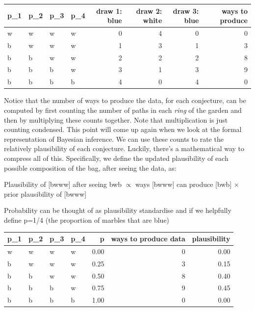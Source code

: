 \documentclass{article}
\begin{document}
\begin{table}
\centering
\begin{tabular}{l|l|l|l|r|r|r|r}
\hline
p\_1 & p\_2 & p\_3 & p\_4 & draw 1: blue & draw 2: white & draw 3: blue & ways to produce\\
\hline
w & w & w & w & 0 & 4 & 0 & 0\\
\hline
b & w & w & w & 1 & 3 & 1 & 3\\
\hline
b & b & w & w & 2 & 2 & 2 & 8\\
\hline
b & b & b & w & 3 & 1 & 3 & 9\\
\hline
b & b & b & b & 4 & 0 & 4 & 0\\
\hline
\end{tabular}
\end{table}

Notice that the number of ways to produce the data, for each conjecture,
can be computed by first counting the number of paths in each
\emph{ring} of the garden and then by multiplying these counts together.
Note that multiplication is just counting condensed. This point will
come up again when we look at the formal representation of Bayesian
inference. We can use these counts to rate the relatively plausibility
of each conjecture. Luckily, there's a mathematical way to compress all
of this. Specifically, we define the updated plausibility of each
possible composition of the bag, after seeing the data, as:

Plausibility of {[}bwww{]} after seeing bwb \(\propto\) ways {[}bwww{]}
can produce {[}bwb{]} \(\times\) prior plausibility of {[}bwww{]}

Probability can be thought of as plausibility standardise and if we
helpfully define p=1/4 (the proportion of marbles that are blue)

\begin{table}
\centering
\begin{tabular}{l|l|l|l|r|r|r}
\hline
p\_1 & p\_2 & p\_3 & p\_4 & p & ways to produce data & plausibility\\
\hline
w & w & w & w & 0.00 & 0 & 0.00\\
\hline
b & w & w & w & 0.25 & 3 & 0.15\\
\hline
b & b & w & w & 0.50 & 8 & 0.40\\
\hline
b & b & b & w & 0.75 & 9 & 0.45\\
\hline
b & b & b & b & 1.00 & 0 & 0.00\\
\hline
\end{tabular}
\end{table}
\end{document}
